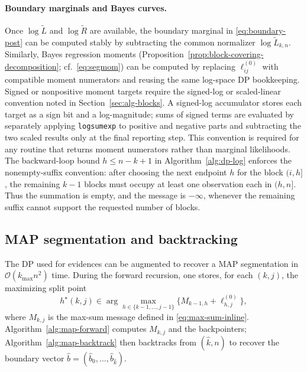 \paragraph{Boundary marginals and Bayes curves.}
Once $\log\widetilde{L}$ and $\log\widetilde{R}$ are available, the boundary marginal in
\eqref{eq:boundary-post} can be computed stably by subtracting the common normalizer
$\log\widetilde{L}_{k,n}$.
Similarly, Bayes regression moments (Proposition~\ref{prop:block-covering-decomposition}; cf.\ \eqref{eq:segmom})
can be computed by replacing $\ell^{(0)}_{ij}$ with compatible moment numerators and reusing the
same log-space DP bookkeeping. Signed or nonpositive moment targets require the signed-log or
scaled-linear convention noted in Section~\ref{sec:alg-blocks}.
A signed-log accumulator stores each target as a sign bit and a log-magnitude; sums of signed
terms are evaluated by separately applying \texttt{logsumexp} to positive and negative parts
and subtracting the two scaled results only at the final reporting step. This convention is required
for any routine that returns moment numerators rather than marginal likelihoods.
The backward-loop bound $h\le n-k+1$ in Algorithm~\ref{alg:dp-log} enforces the nonempty-suffix
convention: after choosing the next endpoint $h$ for the block $(i,h]$, the remaining $k-1$
blocks must occupy at least one observation each in $(h,n]$. Thus the summation is empty, and the
message is $-\infty$, whenever the remaining suffix cannot support the requested number of blocks.

\subsection{MAP segmentation and backtracking}
\label{sec:alg-map}

The DP used for evidences can be augmented to recover a MAP segmentation in
$\mathcal{O}(k_{\max}n^2)$ time.
During the forward recursion, one stores, for each $(k,j)$, the maximizing split point
\begin{equation}
    h^\star(k,j)\in\arg\max_{h\in\{k-1,\dots,j-1\}} \Big\{M_{k-1,h}+\ell^{(0)}_{h,j}\Big\},
    \label{eq:map-backpointer}
\end{equation}
where $M_{k,j}$ is the max-sum message defined in \eqref{eq:max-sum-inline}.
Algorithm~\ref{alg:map-forward} computes $M_{k,j}$ and the backpointers; Algorithm~\ref{alg:map-backtrack} then backtracks from $(\widehat{k},n)$ to recover the boundary vector
$\widehat{b}=(\widehat{b}_0,\dots,\widehat{b}_{\widehat{k}})$.

